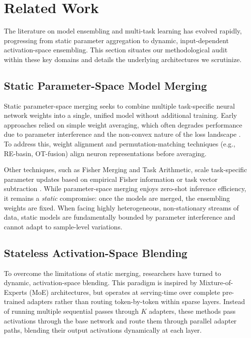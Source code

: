 \section{Related Work}
\label{sec:related_work}

The literature on model ensembling and multi-task learning has evolved rapidly, progressing from static parameter aggregation to dynamic, input-dependent activation-space ensembling. This section situates our methodological audit within these key domains and details the underlying architectures we scrutinize.

\subsection{Static Parameter-Space Model Merging}
Static parameter-space merging seeks to combine multiple task-specific neural network weights into a single, unified model without additional training. Early approaches relied on simple weight averaging, which often degrades performance due to parameter interference and the non-convex nature of the loss landscape \citep{touvron23llama, dosovitskiy20vit}. To address this, weight alignment and permutation-matching techniques (e.g., RE-basin, OT-fusion) align neuron representations before averaging. 

Other techniques, such as Fisher Merging and Task Arithmetic, scale task-specific parameter updates based on empirical Fisher information or task vector subtraction \citep{hu2021lora}. While parameter-space merging enjoys zero-shot inference efficiency, it remains a \emph{static} compromise: once the models are merged, the ensembling weights are fixed. When facing highly heterogeneous, non-stationary streams of data, static models are fundamentally bounded by parameter interference and cannot adapt to sample-level variations.

\subsection{Stateless Activation-Space Blending}
To overcome the limitations of static merging, researchers have turned to dynamic, activation-space blending. This paradigm is inspired by Mixture-of-Experts (MoE) architectures, but operates at serving-time over complete pre-trained adapters rather than routing token-by-token within sparse layers. Instead of running multiple sequential passes through $K$ adapters, these methods pass activations through the base network and route them through parallel adapter paths, blending their output activations dynamically at each layer.

